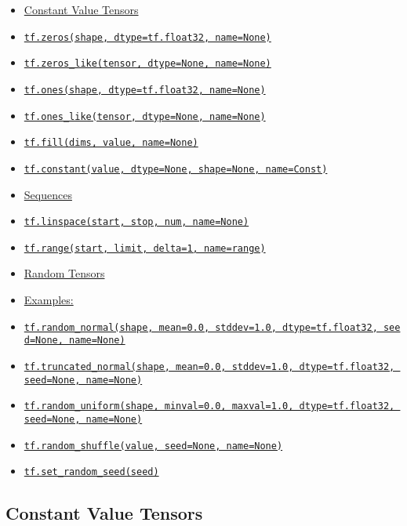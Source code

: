 \begin{itemize}
\tightlist
\item
  \protect\hyperlink{AUTOGENERATED-constant-value-tensors}{Constant
  Value Tensors}
\item
  \protect\hyperlink{zeros}{\texttt{tf.zeros(shape,\ dtype=tf.float32,\ name=None)}}
\item
  \protect\hyperlink{zerosux5flike}{\texttt{tf.zeros\_like(tensor,\ dtype=None,\ name=None)}}
\item
  \protect\hyperlink{ones}{\texttt{tf.ones(shape,\ dtype=tf.float32,\ name=None)}}
\item
  \protect\hyperlink{onesux5flike}{\texttt{tf.ones\_like(tensor,\ dtype=None,\ name=None)}}
\item
  \protect\hyperlink{fill}{\texttt{tf.fill(dims,\ value,\ name=None)}}
\item
  \protect\hyperlink{constant}{\texttt{tf.constant(value,\ dtype=None,\ shape=None,\ name=\textquotesingle{}Const\textquotesingle{})}}
\item
  \protect\hyperlink{AUTOGENERATED-sequences}{Sequences}
\item
  \protect\hyperlink{linspace}{\texttt{tf.linspace(start,\ stop,\ num,\ name=None)}}
\item
  \protect\hyperlink{range}{\texttt{tf.range(start,\ limit,\ delta=1,\ name=\textquotesingle{}range\textquotesingle{})}}
\item
  \protect\hyperlink{AUTOGENERATED-random-tensors}{Random Tensors}
\item
  \protect\hyperlink{AUTOGENERATED-examples-}{Examples:}
\item
  \protect\hyperlink{randomux5fnormal}{\texttt{tf.random\_normal(shape,\ mean=0.0,\ stddev=1.0,\ dtype=tf.float32,\ seed=None,\ name=None)}}
\item
  \protect\hyperlink{truncatedux5fnormal}{\texttt{tf.truncated\_normal(shape,\ mean=0.0,\ stddev=1.0,\ dtype=tf.float32,\ seed=None,\ name=None)}}
\item
  \protect\hyperlink{randomux5funiform}{\texttt{tf.random\_uniform(shape,\ minval=0.0,\ maxval=1.0,\ dtype=tf.float32,\ seed=None,\ name=None)}}
\item
  \protect\hyperlink{randomux5fshuffle}{\texttt{tf.random\_shuffle(value,\ seed=None,\ name=None)}}
\item
  \protect\hyperlink{setux5frandomux5fseed}{\texttt{tf.set\_random\_seed(seed)}}
\end{itemize}

\subsection{Constant Value Tensors }\label{constant-value-tensors}

